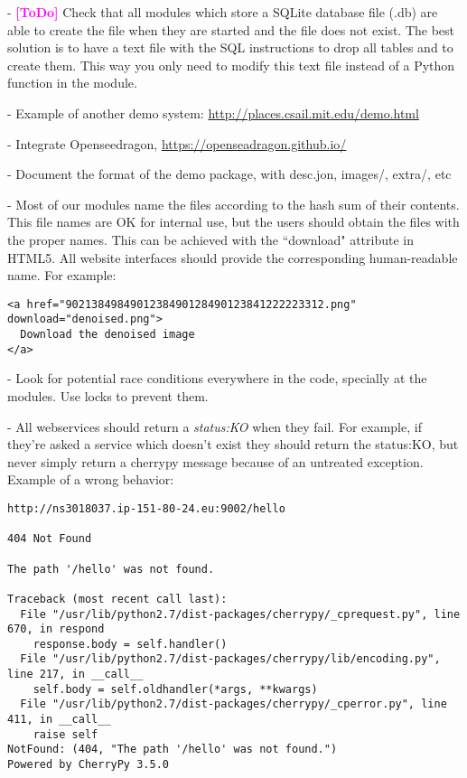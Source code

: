 \documentclass[a4paper,12pt]{article}
\newcommand{\ToDo}[1]{\textcolor{magenta}{\textbf{[ToDo]} \textbf{#1}}}
\begin{document}
- \ToDo{} Check that all modules which store a SQLite database file (.db) are able to create the file when they are started and the file does not exist. The best solution is to have a text file with the SQL instructions to drop all  tables and to create them. This way you only need to modify this text file instead of a Python function in the module.

- Example of another demo system: \url{http://places.csail.mit.edu/demo.html}

- Integrate Openseedragon, \url{https://openseadragon.github.io/}

- Document the format of the demo package, with desc.jon, images/, extra/, etc

- Most of our modules name the files according to the hash sum of their contents. This file names are OK for internal use, but the users should obtain the files with the proper names. This can be achieved with the ``download" attribute in HTML5. All website interfaces should provide the corresponding human-readable name. For example:

\begin{verbatim}
<a href="9021384984901238490128490123841222223312.png" download="denoised.png">
  Download the denoised image
</a>
\end{verbatim}

- Look for potential race conditions everywhere in the code, specially at the modules. Use locks to prevent them.

- All webservices should return a \emph{status:KO} when they fail. For example, if they're asked a service which doesn't exist they should return the status:KO, but never simply return a cherrypy message because of an untreated exception. Example of a wrong behavior:

\begin{verbatim}
http://ns3018037.ip-151-80-24.eu:9002/hello

404 Not Found

The path '/hello' was not found.

Traceback (most recent call last):
  File "/usr/lib/python2.7/dist-packages/cherrypy/_cprequest.py", line 670, in respond
    response.body = self.handler()
  File "/usr/lib/python2.7/dist-packages/cherrypy/lib/encoding.py", line 217, in __call__
    self.body = self.oldhandler(*args, **kwargs)
  File "/usr/lib/python2.7/dist-packages/cherrypy/_cperror.py", line 411, in __call__
    raise self
NotFound: (404, "The path '/hello' was not found.")
Powered by CherryPy 3.5.0
\end{verbatim}
\end{document}
